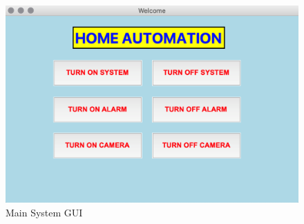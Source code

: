			\begin{figure}[h]
				\centering
				\includegraphics[width=0.75\linewidth]{gui.png}
				\caption{Main System GUI}
				\label{fig:maingui}
			\end{figure}
					
